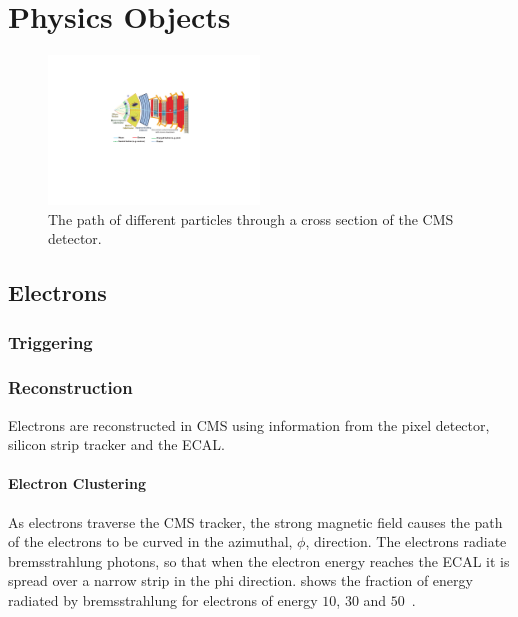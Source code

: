 \chapter{Physics Objects}


\begin{figure}[htb]
  \centering
  \includegraphics[width=0.5\textwidth]{slice}
  \caption{The path of different particles through a cross section of the CMS detector.}
  \label{reco:crosssec}
\end{figure}

\section{Electrons}

\subsection{Triggering}

\subsection{Reconstruction}
Electrons are reconstructed in CMS using information from the pixel detector,
silicon strip tracker and the ECAL.

\subsubsection{Electron Clustering}
As electrons traverse the CMS tracker, the strong magnetic field causes the path
of the electrons to be curved in the azimuthal, $\phi$, direction. The electrons
radiate bremsstrahlung photons, so that when the electron energy reaches the
ECAL it is spread over a narrow strip in the phi direction.
 shows the fraction of energy radiated by bremsstrahlung for
electrons of energy $10$, $30$ and \unit{$50$}{\GeV}.

